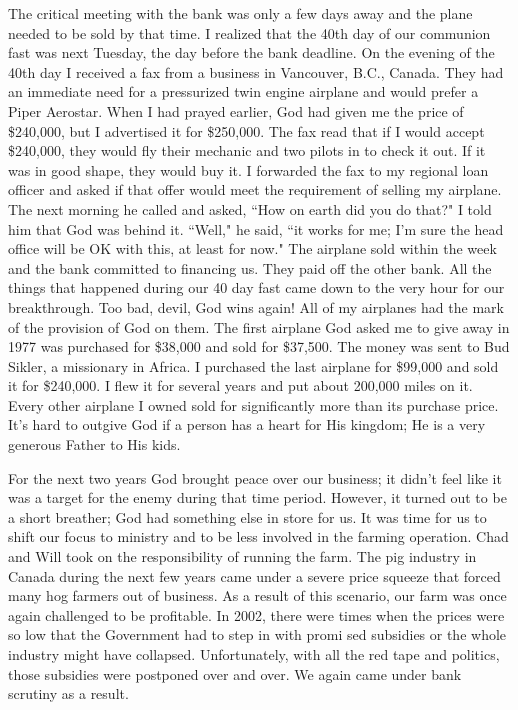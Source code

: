 \documentclass[oneside,12pt]{book}
\begin{document}
The critical meeting with the bank was only a few days away and the plane needed to be sold by that time. I realized that the 40th day of our communion fast was next Tuesday, the day before the bank deadline. On the evening of the 40th day I received a fax from a business in Vancouver, B.C., Canada. They had an immediate need for a pressurized twin engine airplane and would prefer a Piper Aerostar. When I had prayed earlier, God had given me the price of \$240,000, but I advertised it for \$250,000. The fax read that if I would accept \$240,000, they would fly their mechanic and two pilots in to check it out. If it was in good shape, they would buy it. I forwarded the fax to my regional loan officer and asked if that offer would meet the requirement of selling my airplane. The next morning he called and asked, ``How on earth did you do that?" I told him that God was behind it. ``Well," he said, ``it works for me; I'm sure the head office will be OK with this, at least for now." The airplane sold within the week and the bank committed to financing us. They paid off the other bank. All the things that happened during our 40 day fast came down to the very hour for our breakthrough. Too bad, devil, God wins again! All of my airplanes had the mark of the provision of God on them. The first airplane God asked me to give away in 1977 was purchased for \$38,000 and sold for \$37,500. The money was sent to Bud Sikler, a missionary in Africa. I purchased the last airplane for \$99,000 and sold it for \$240,000. I flew it for several years and put about 200,000 miles on it. Every other airplane I owned sold for significantly more than its purchase price. It's hard to outgive God if a person has a heart for His kingdom; He is a very generous Father to His kids.

For the next two years God brought peace over our business; it didn't feel like it was a target for the enemy during that time period. However, it turned out to be a short breather; God had something else in store for us. It was time for us to shift our focus to ministry and to be less involved in the farming operation. Chad and Will took on the responsibility of running the farm. The pig industry in Canada during the next few years came under a severe price squeeze that forced many hog farmers out of business. As a result of this scenario, our farm was once again challenged to be profitable. In 2002, there were times when the prices were so low that the Government had to step in with promi
sed subsidies or the whole industry might have collapsed. Unfortunately, with all the red tape and politics, those subsidies were postponed over and over. We again came under bank scrutiny as a result.
\end{document}
